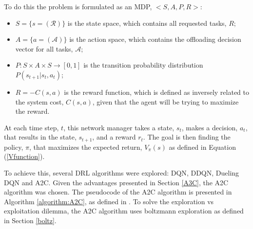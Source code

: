 To do this the problem is formulated as an \acrshort{MDP}, $<S, A, P, R>$:
\begin{itemize}
    \item $S=\{s=(\mathcal{R})\}$ is the state space, which contains all requested tasks, $R$;
    \item $A=\{a=(\mathcal{A})\}$ is the action space, which contains the offloading decision vector for all tasks, $\mathcal{A}$;
    \item $P:S \times A \times S \rightarrow [0, 1]$ is the transition probability distribution $P(s_{t+1}|s_t, a_t)$;
    \item $R = -C(s,a)$ is the reward function, which is defined as inversely related to the system cost, $C(s,a)$, given that the agent will be trying to maximize the reward.
\end{itemize}

At each time step, $t$, this network manager takes a state, $s_t$, makes a decision, $a_t$, that results in the state, $s_{t+1}$, and a reward $r_t$. The goal is then finding the policy, $\pi$, that maximizes the expected return, $V_\pi(s)$ as defined in Equation (\ref{Vfunction}).

To achieve this, several \acrshort{DRL} algorithms were explored: \acrshort{DQN}, \acrshort{DDQN}, \acrshort{Dueling DQN} and \acrshort{A2C}. Given the advantages presented in Section \ref{A3C}, the \acrshort{A2C} algorithm was chosen. The pseudocode of the \acrshort{A2C} algorithm is presented in Algorithm \ref{algorithm:A2C}, as defined in \cite{a3c}. To solve the exploration vs exploitation dilemma, the \acrshort{A2C} algorithm uses boltzmann exploration as defined in Section \ref{boltz}.

\pagebreak

